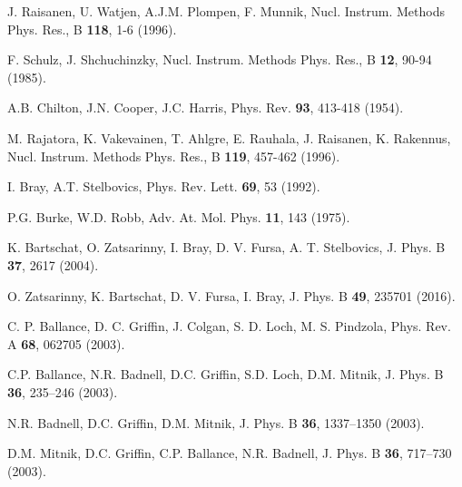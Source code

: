 \begin{thebibliography}{9}
J. Raisanen, U. Watjen, A.J.M. Plompen, F. Munnik, 
Nucl. Instrum. Methods Phys. Res., B \textbf{118}, 1-6  (1996).

F. Schulz, J. Shchuchinzky, 
Nucl. Instrum. Methods Phys. Res., B \textbf{12},  90-94 (1985).

A.B. Chilton, J.N. Cooper, J.C. Harris, 
Phys. Rev. \textbf{93}, 413-418  (1954).

M. Rajatora, K. Vakevainen, T. Ahlgre, E. Rauhala, J. Raisanen, K. Rakennus, 
Nucl. Instrum. Methods Phys. Res., B \textbf{119}, 457-462 (1996).




I. Bray, A.T. Stelbovics, 
Phys. Rev. Lett. \textbf{69}, 53 (1992).

P.G. Burke, W.D. Robb, 
Adv. At. Mol. Phys. \textbf{11}, 143 (1975).

K. Bartschat, O. Zatsarinny, I. Bray, D. V. Fursa, A. T. Stelbovics,
J. Phys. B \textbf{37}, 2617 (2004).

O. Zatsarinny, K. Bartschat, D. V. Fursa, I. Bray,
J. Phys. B \textbf{49}, 235701 (2016).

C. P. Ballance, D. C. Griffin, J. Colgan, S. D. Loch, M. S. Pindzola,
Phys. Rev. A \textbf{68}, 062705 (2003).

C.P. Ballance, N.R. Badnell, D.C. Griffin, S.D. Loch, D.M. Mitnik, 
J. Phys. B \textbf{36}, 235--246 (2003).

N.R. Badnell, D.C. Griffin, D.M. Mitnik, 
J. Phys. B \textbf{36}, 1337--1350 (2003).

D.M. Mitnik, D.C. Griffin, C.P. Ballance, N.R. Badnell, 
J. Phys. B \textbf{36}, 717--730 (2003).


\end{thebibliography}
